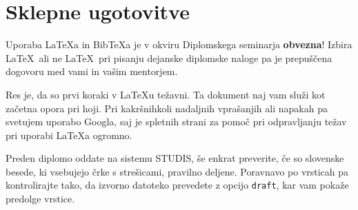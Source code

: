 \documentclass[a4paper, 12pt]{book}
\newcommand{\BibTeX}{{\sc Bib}\TeX}
\begin{document}


\chapter{Sklepne ugotovitve}

Uporaba \LaTeX{a} in \BibTeX{a} je v okviru Diplomskega seminarja \textbf{obvezna}!
Izbira \LaTeX\ ali ne \LaTeX\ pri pisanju dejanske diplomske naloge pa je pre\-pu\-šče\-na dogovoru med vami in vašim mentorjem.

Res je, da so prvi koraki v \LaTeX{}u težavni. 
Ta dokument naj vam služi kot začetna opora pri hoji.
Pri kakršnihkoli nadaljnih vprašanjih ali napakah pa svetujem uporabo Googla, saj je spletnih strani za pomoč pri odpravljanju težav pri uporabi \LaTeX{}a ogromno.

Preden diplomo oddate na sistemu STUDIS, še enkrat preverite, če so slovenske besede, ki vsebujejo črke s strešicami,  pravilno deljene.
Poravnavo po vrsticah pa kontrolirajte tako, da izvorno datoteko prevedete z opcijo \texttt{draft}, kar vam pokaže predolge vrstice.


\cleardoublepage
{}


\end{document}
